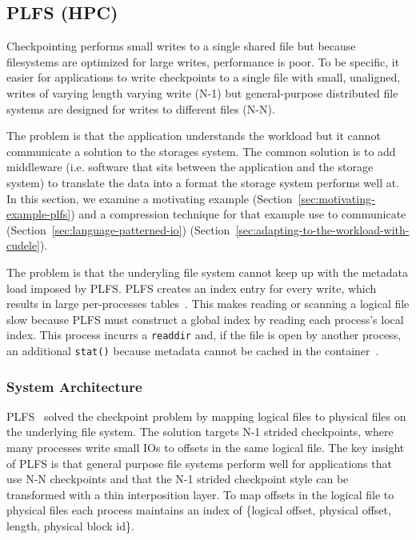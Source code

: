 \subsection{PLFS (HPC)}
\label{sec:plfs}
Checkpointing performs small writes to a single shared file but because
filesystems are optimized for large writes, performance is poor. To be
specific, it easier for applications to write checkpoints to a single file with
small, unaligned, writes of varying length varying write (N-1) but
general-purpose distributed file systems are designed for writes to different
files (N-N).

The problem is that the application understands the workload but it cannot
communicate a solution to the storages system. The common solution is to add
middleware (i.e. software that sits between the application and the storage
system) to translate the data into a format the storage system performs well
at. In this section, we examine a motivating example
(Section~\ref{sec:motivating-example-plfs}) and a compression technique for that example
use to communicate (Section~\ref{sec:language-patterned-io})
(Section~\ref{sec:adapting-to-the-workload-with-cudele}).  

The problem is that the underyling file system cannot keep up with the metadata
load imposed by PLFS. PLFS creates an index entry for every write, which
results in large per-processes tables~\cite{grider:pc17-diddlings}. This makes
reading or scanning a logical file slow because PLFS must construct a global
index by reading each process's local index. This process incurrs a
\texttt{readdir} and, if the file is open by another process, an additional
\texttt{stat()} because metadata cannot be cached in the
container~\cite{bent_plfs_2009}.

\subsubsection{System Architecture}
PLFS~\cite{bent_plfs_2009} solved the checkpoint problem by mapping logical
files to physical files on the underlying file system. The solution targets N-1
strided checkpoints, where many processes write small IOs to offsets in the
same logical file. The key insight of PLFS is that general purpose file systems
perform well for applications that use N-N checkpoints and that the N-1 strided
checkpoint style can be transformed with a thin interposition layer. To map
offsets in the logical file to physical files each process maintains an index
of \{logical offset, physical offset, length, physical block id\}. 

